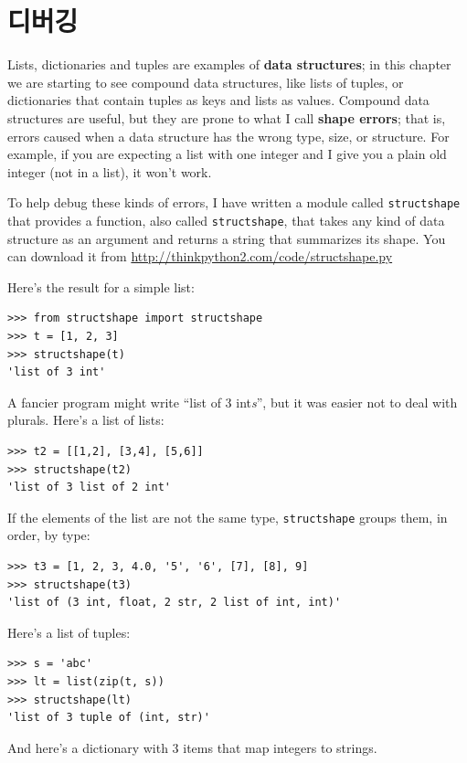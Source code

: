 \documentclass[10pt]{book}
\begin{document}
\section{디버깅}

Lists, dictionaries and tuples are examples of {\bf data
  structures}; in this chapter we are starting to see compound data
structures, like lists of tuples, or dictionaries that contain tuples
as keys and lists as values.  Compound data structures are useful, but
they are prone to what I call {\bf shape errors}; that is, errors
caused when a data structure has the wrong type, size, or structure.
For example, if you are expecting a list with one integer and I
give you a plain old integer (not in a list), it won't work.

To help debug these kinds of errors, I have written a module
called {\tt structshape} that provides a function, also called
{\tt structshape}, that takes any kind of data structure as
an argument and returns a string that summarizes its shape.
You can download it from \url{http://thinkpython2.com/code/structshape.py}

Here's the result for a simple list:

\begin{verbatim}
>>> from structshape import structshape
>>> t = [1, 2, 3]
>>> structshape(t)
'list of 3 int'
\end{verbatim}
%
A fancier program might write ``list of 3 int{\em s}'', but it
was easier not to deal with plurals.  Here's a list of lists:

\begin{verbatim}
>>> t2 = [[1,2], [3,4], [5,6]]
>>> structshape(t2)
'list of 3 list of 2 int'
\end{verbatim}
%
If the elements of the list are not the same type,
{\tt structshape} groups them, in order, by type:

\begin{verbatim}
>>> t3 = [1, 2, 3, 4.0, '5', '6', [7], [8], 9]
>>> structshape(t3)
'list of (3 int, float, 2 str, 2 list of int, int)'
\end{verbatim}
%
Here's a list of tuples:

\begin{verbatim}
>>> s = 'abc'
>>> lt = list(zip(t, s))
>>> structshape(lt)
'list of 3 tuple of (int, str)'
\end{verbatim}
%
And here's a dictionary with 3 items that map integers to strings.
\end{document}
